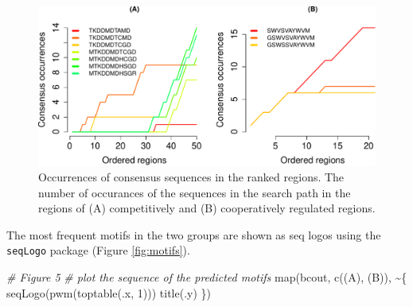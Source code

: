 \documentclass[9pt,a4paper,]{extarticle}
\newenvironment{Shaded}{\begin{snugshade}}{\end{snugshade}}
\newcommand{\CommentTok}[1]{\textcolor[rgb]{0.56,0.35,0.01}{\textit{#1}}}
\newcommand{\DecValTok}[1]{\textcolor[rgb]{0.00,0.00,0.81}{#1}}
\newcommand{\FunctionTok}[1]{\textcolor[rgb]{0.00,0.00,0.00}{#1}}
\newcommand{\NormalTok}[1]{#1}
\newcommand{\SpecialCharTok}[1]{\textcolor[rgb]{0.00,0.00,0.00}{#1}}
\newcommand{\StringTok}[1]{\textcolor[rgb]{0.31,0.60,0.02}{#1}}
\begin{document}
\begin{figure}

{\centering \includegraphics[width=1\linewidth]{targetFlow_files/figure-latex/occurrences-1} 

}

\caption{Occurrences of consensus sequences in the ranked regions. The number of occurances of the sequences in the search path in the regions of (A) competitively and (B) cooperatively regulated regions.}\label{fig:occurrences}
\end{figure}

The most frequent motifs in the two groups are shown as seq logos using the \texttt{seqLogo} package (Figure \ref{fig:motifs}).

\begin{Shaded}
\begin{Highlighting}[]
\CommentTok{\# Figure 5}
\CommentTok{\# plot the sequence of the predicted motifs}
\FunctionTok{map}\NormalTok{(bcout, }\FunctionTok{c}\NormalTok{(}\StringTok{\textquotesingle{}(A)\textquotesingle{}}\NormalTok{, }\StringTok{\textquotesingle{}(B)\textquotesingle{}}\NormalTok{), }\SpecialCharTok{\textasciitilde{}}\NormalTok{\{}
    \FunctionTok{seqLogo}\NormalTok{(}\FunctionTok{pwm}\NormalTok{(}\FunctionTok{toptable}\NormalTok{(.x, }\DecValTok{1}\NormalTok{)))}
    \FunctionTok{title}\NormalTok{(.y)}
\NormalTok{\})}
\end{Highlighting}
\end{Shaded}
\end{document}
